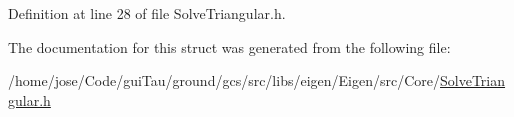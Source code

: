 Definition at line 28 of file Solve\-Triangular.\-h.



The documentation for this struct was generated from the following file\-:\begin{DoxyCompactItemize}
\item 
/home/jose/\-Code/gui\-Tau/ground/gcs/src/libs/eigen/\-Eigen/src/\-Core/\hyperlink{_solve_triangular_8h}{Solve\-Triangular.\-h}\end{DoxyCompactItemize}
